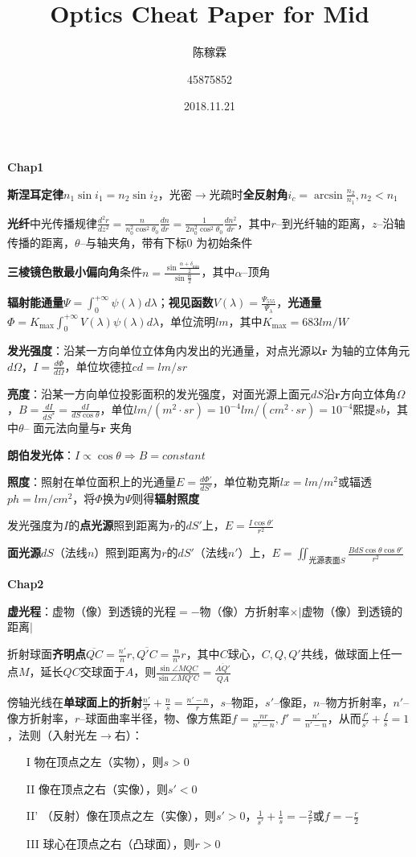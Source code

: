 \documentclass[10pt,a4paper]{article}
\title{Optics Cheat Paper for Mid}
\author{陈稼霖 \and 45875852}
\date{2018.11.21}
\begin{document}
\scriptsize
\textbf{Chap1}

\textbf{斯涅耳定律}$n_1\sin i_1=n_2\sin i_2$，光密$\to$光疏时\textbf{全反射角}$i_c=\arcsin\frac{n_2}{n_1}, n_2<n_1$

\textbf{光纤}中光传播规律$\frac{d^2r}{dz^2}=\frac{n}{n_0^2\cos^2\theta_0}\frac{dn}{dr}=\frac{1}{2n_0^2\cos^2\theta_0}\frac{dn^2}{dr}$，其中$r$--到光纤轴的距离，$z$--沿轴传播的距离，$\theta$--与轴夹角，带有下标$0$ 为初始条件

\textbf{三棱镜色散最小偏向角}条件$n=\frac{\sin\frac{\alpha+\delta_{\min}}{2}}{\sin\frac{\alpha}{2}}$，其中$\alpha$--顶角

\textbf{辐射能通量}$\Psi=\int_0^{+\infty}\psi(\lambda)d\lambda$；\textbf{视见函数}$V(\lambda)=\frac{\Psi_{555}}{\Psi_\lambda}$，\textbf{光通量}$\Phi=K_{\max}\int_0^{+\infty}V(\lambda)\psi(\lambda)d\lambda$，单位流明$lm$，其中$K_{\max}=683lm/W$

\textbf{发光强度}：沿某一方向单位立体角内发出的光通量，对点光源以$\bm{r}$ 为轴的立体角元$d\Omega$，$I=\frac{d\Phi}{d\Omega}$，单位坎德拉$cd=lm/sr$

\textbf{亮度}：沿某一方向单位投影面积的发光强度，对面光源上面元$dS$沿$\bm{r}$方向立体角$\Omega$，$B=\frac{dI}{dS^*}=\frac{dI}{dS\cos\theta}$，单位$lm/(m^2\cdot sr)=10^{-4}lm/(cm^2\cdot sr)=10^{-4}\text{熙提}sb$，其中$\theta$-- 面元法向量与$\bm{r}$ 夹角

\textbf{朗伯发光体}：$I\propto\cos\theta\Longrightarrow B=constant$

\textbf{照度}：照射在单位面积上的光通量$E=\frac{d\Phi'}{dS'}$，单位勒克斯$lx=lm/m^2$或辐透$ph=lm/cm^2$，将$\Phi$换为$\Psi$则得\textbf{辐射照度}

发光强度为$I$的\textbf{点光源}照到距离为$r$的$dS'$上，$E=\frac{I\cos\theta'}{r^2}$

\textbf{面光源}$dS$（法线$n$）照到距离为$r$的$dS'$（法线$n'$）上，$E=\iint_{\text{光源表面}S}\frac{BdS\cos\theta\cos\theta'}{r^2}$

\textbf{Chap2}

\textbf{虚光程}：虚物（像）到透镜的光程$=-$物（像）方折射率$\times|$虚物（像）到透镜的距离$|$

折射球面\textbf{齐明点}$\overline{QC}=\frac{n'}{n}r,\overline{Q'C}=\frac{n}{n'}r$，其中$C$球心，$C,Q,Q'$共线，做球面上任一点$M$，延长$QC$交球面于$A$，则$\frac{\sin\angle MQC}{\sin\angle MQ'C}=\frac{\overline{AQ'}}{\overline{QA}}$

傍轴光线在\textbf{单球面上的折射}$\frac{n'}{s'}+\frac{n}{s}=\frac{n'-n}{r}$，$s$--物距，$s'$--像距，$n$--物方折射率，$n'$--像方折射率，$r$--球面曲率半径，物、像方焦距$f=\frac{nr}{n'-n},f'=\frac{n'}{n'-n}$，从而$\frac{f'}{s'}+\frac{f}{s}=1$，法则（入射光左$\to$右）：
\begin{itemize}
  \item[I] 物在顶点之左（实物），则$s>0$
  \item[II] 像在顶点之右（实像），则$s'<0$
  \item[II'] （反射）像在顶点之左（实像），则$s'>0$，$\frac{1}{s'}+\frac{1}{s}=-\frac{2}{r}$或$f=-\frac{r}{2}$
  \item[III] 球心在顶点之右（凸球面），则$r>0$
\end{itemize}
\end{document}
